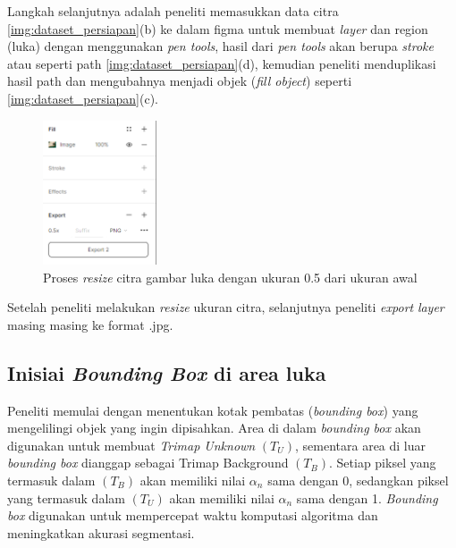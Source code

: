 Langkah selanjutnya adalah peneliti memasukkan data citra \ref{img:dataset_persiapan}(b) ke dalam figma untuk
membuat \emph{layer} dan region (luka) dengan menggunakan \emph{pen tools}, hasil 
dari \emph{pen tools} akan berupa \emph{stroke} atau seperti path \ref{img:dataset_persiapan}(d), kemudian 
peneliti menduplikasi hasil path dan mengubahnya menjadi objek (\emph{fill object})
seperti \ref{img:dataset_persiapan}(c).

\begin{figure}[H]
	\centering{}
	\includegraphics[width=0.3\textwidth]{gambar/gambar-3_4.png}
	\caption{Proses \emph{resize} citra gambar luka dengan ukuran 0.5 dari ukuran awal}
  \end{figure}

Setelah peneliti melakukan \emph{resize} ukuran citra, selanjutnya peneliti \emph{export}
\emph{layer} masing masing ke format .jpg.


\subsection{Inisiai \emph{Bounding Box} di area luka}

Peneliti memulai dengan menentukan kotak pembatas (\emph{bounding box}) yang mengelilingi 
objek yang ingin dipisahkan. Area di dalam \emph{bounding box} akan digunakan untuk membuat 
\emph{Trimap Unknown} \((T_{U})\), sementara area di luar \emph{bounding box} dianggap sebagai Trimap 
Background \((T_{B})\). Setiap piksel yang termasuk dalam \((T_{B})\) akan memiliki nilai 
\(\alpha_{n}\) sama dengan 0, sedangkan piksel yang termasuk dalam \((T_{U})\) akan memiliki nilai 
\(\alpha_{n}\) sama dengan 1. \emph{Bounding box} digunakan untuk mempercepat waktu komputasi algoritma dan meningkatkan 
akurasi segmentasi.

